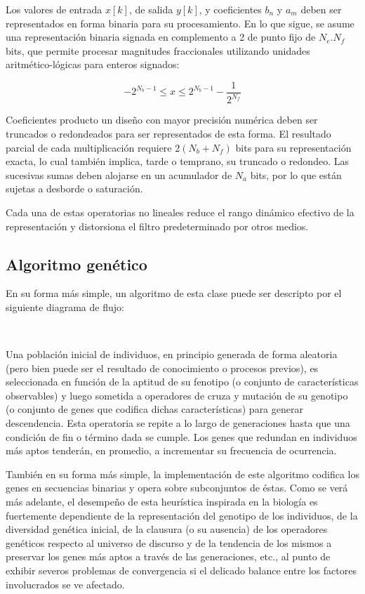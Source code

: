 \documentclass[11pt, journal]{IEEEtran}
\begin{document}
Los valores de entrada \(x[k]\), de salida \(y[k]\), y coeficientes
\(b_n\) y \(a_m\) deben ser representados en forma binaria para su
procesamiento. En lo que sigue, se asume una representación binaria
signada en complemento a 2 de punto fijo de \(N_e.N_f\) bits, que
permite procesar magnitudes fraccionales utilizando unidades
aritmético-lógicas para enteros signados:

\[ -2^{N_b-1} \leq x \leq 2^{N_b-1}-\frac{1}{2^{N_f}} \]

Coeficientes producto un diseño con mayor precisión numérica deben ser
truncados o redondeados para ser representados de esta forma. El
resultado parcial de cada multiplicación requiere \(2(N_b + N_f)\) bits
para su representación exacta, lo cual también implica, tarde o
temprano, su truncado o redondeo. Las sucesivas sumas deben alojarse en
un acumulador de \(N_a\) bits, por lo que están sujetas a desborde o
saturación.

Cada una de estas operatorias no lineales reduce el rango dinámico
efectivo de la representación y distorsiona el filtro predeterminado por
otros medios.

    \subsection{Algoritmo genético}

En su forma más simple, un algoritmo de esta clase puede ser descripto
por el siguiente diagrama de flujo:

    
    \begin{center}
    \end{center}
    { \hspace*{\fill} \\}
    

    Una población inicial de individuos, en principio generada de forma
aleatoria (pero bien puede ser el resultado de conocimiento o procesos
previos), es seleccionada en función de la aptitud de su fenotipo (o
conjunto de características observables) y luego sometida a operadores
de cruza y mutación de su genotipo (o conjunto de genes que codifica
dichas características) para generar descendencia. Esta operatoria se
repite a lo largo de generaciones hasta que una condición de fin o
término dada se cumple. Los genes que redundan en individuos más aptos
tenderán, en promedio, a incrementar su frecuencia de ocurrencia.

También en su forma más simple, la implementación de este algoritmo
codifica los genes en secuencias binarias y opera sobre subconjuntos de
éstas. Como se verá más adelante, el desempeño de esta heurística
inspirada en la biología es fuertemente dependiente de la representación
del genotipo de los individuos, de la diversidad genética inicial, de la
clausura (o su ausencia) de los operadores genéticos respecto al
universo de discurso y de la tendencia de los mismos a preservar los
genes más aptos a través de las generaciones, etc., al punto de exhibir
severos problemas de convergencia si el delicado balance entre los
factores involucrados se ve afectado.
\end{document}
